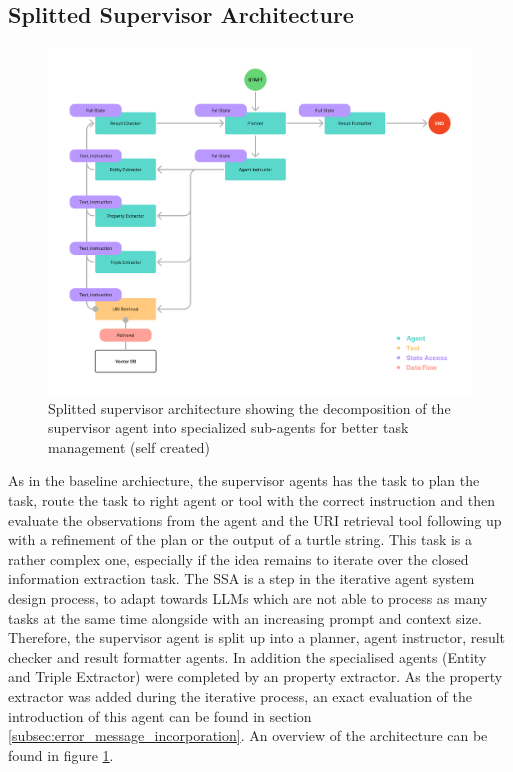 \documentclass[a4paper,oneside,bibliography=totoc]{scrbook}
\begin{document}
\subsection{Splitted Supervisor Architecture}
\label{subsec:supervisor}

\begin{figure}[h]
  \centering
  \includegraphics[width=\textwidth]{figures/Splitted Supervisor Architecture.png}
  \caption[Splitted supervisor architecture showing the decomposition of the supervisor agent into specialized sub-agents for better task management]{Splitted supervisor architecture showing the decomposition of the supervisor agent into specialized sub-agents for better task management (self created)}
  \label{fig:splitted_supervisor_architecture}
\end{figure}

As in the baseline archiecture, the supervisor agents has the task to plan the task, route the task to right agent or tool with the correct instruction and then evaluate the observations from the agent and the URI retrieval tool following up with a refinement of the plan or the output of a turtle string. This task is a rather complex one, especially if the idea remains to iterate over the closed information extraction task. The \ac{SSA} is a step in the iterative agent system design process, to adapt towards \acp{LLM} which are not able to process as many tasks at the same time alongside with an increasing prompt and context size. Therefore, the supervisor agent is split up into a planner, agent instructor, result checker and result formatter agents. In addition the specialised agents (Entity and Triple Extractor) were completed by an property extractor. As the property extractor was added during the iterative process, an exact evaluation of the introduction of this agent can be found in section \ref{subsec:error_message_incorporation}. An overview of the architecture can be found in figure \ref{fig:splitted_supervisor_architecture}.
\end{document}
